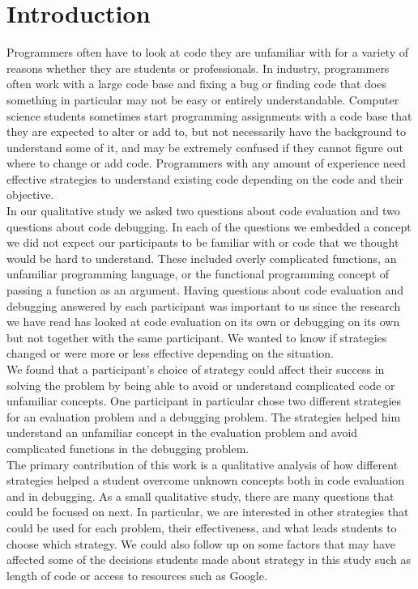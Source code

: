 \documentclass{article}
\begin{document}
\newpage
\section{Introduction}

Programmers often have to look at code they are unfamiliar with for a variety of reasons whether they are students or professionals.
In industry, programmers often work with a large code base and fixing a bug or finding code that does something in particular may not be easy or entirely understandable.
Computer science students sometimes start programming assignments with a code base that they are expected to alter or add to, but not necessarily have the background to understand some of it, and may be extremely confused if they cannot figure out where to change or add code.
Programmers with any amount of experience need effective strategies to understand existing code depending on the code and their objective. \\

In our qualitative study we asked two questions about code evaluation and two questions about code debugging.
In each of the questions we embedded a concept we did not expect our participants to be familiar with or code that we thought would be hard to understand.
These included overly complicated functions, an unfamiliar programming language, or the functional programming concept of passing a function as an argument.
Having questions about code evaluation and debugging answered by each participant was important to us since the research we have read has looked at code evaluation on its own or debugging on its own but not together with the same participant.
We wanted to know if strategies changed or were more or less effective depending on the situation. \\

We found that a participant's choice of strategy could affect their success in solving the problem by being able to avoid or understand complicated code or unfamiliar concepts.
One participant in particular chose two different strategies for an evaluation problem and a debugging problem.
The strategies helped him understand an unfamiliar concept in the evaluation problem and avoid complicated functions in the debugging problem. \\

The primary contribution of this work is a qualitative analysis of how different strategies helped a student overcome unknown concepts both in code evaluation and in debugging.
As a small qualitative study, there are many questions that could be focused on next.
In particular, we are interested in other strategies that could be used for each problem, their effectiveness, and what leads students to choose which strategy.
We could also follow up on some factors that may have affected some of the decisions students made about strategy in this study such as length of code or access to resources such as Google.\\
\end{document}
